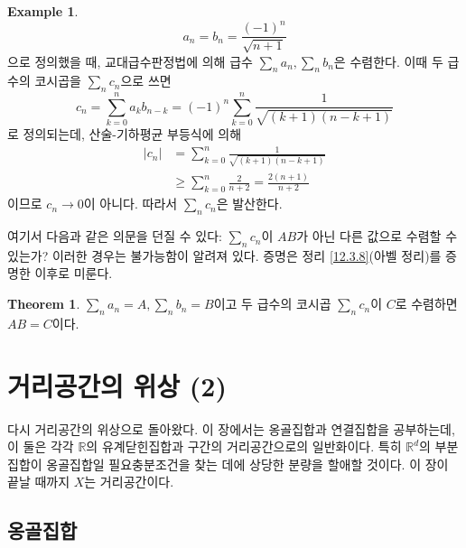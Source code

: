 \documentclass[11pt]{book}
\numberwithin{equation}{chapter}
\def\RR{\mathbb{R}}
\newcommand{\abs}[1]{\left\vert#1\right\vert}
\theoremstyle{definition}
\newtheorem{thm}{Theorem}[section]
\newtheorem*{ex}{Example}
\begin{document}
\begin{ex}
    \[
    a_n = b_n = \frac{(-1)^n}{\sqrt{n+1}}    
    \]
    으로 정의했을 때, 교대급수판정법에 의해 급수 \(\sum_n a_n, \sum_n b_n\)은 수렴한다. 이때 두 급수의 코시곱을 \(\sum_n c_n\)으로 쓰면
    \[
    c_n =  \sum_{k=0}^n a_k b_{n-k} = (-1)^n \sum_{k=0}^n \frac{1}{\sqrt{(k+1)(n-k+1)}}   
    \]
    로 정의되는데, 산술-기하평균 부등식에 의해
    \begin{align*}
        \abs{c_n} &= \sum_{k=0}^n \frac{1}{\sqrt{(k+1)(n-k+1)}}\\
        &\ge \sum_{k=0}^n \frac{2}{n+2} = \frac{2(n+1)}{n+2}
    \end{align*}
    이므로 \(c_n \to 0\)이 아니다. 따라서 \(\sum_n c_n\)은 발산한다.
\end{ex}

여기서 다음과 같은 의문을 던질 수 있다: \(\sum_n c_n\)이 \(AB\)가 아닌 다른 값으로 수렴할 수 있는가? 이러한 경우는 불가능함이 알려져 있다. 증명은 정리 \ref{12.3.8}(아벨 정리)를 증명한 이후로 미룬다.

\begin{thm} \label{5.9.3}
    \(\sum_n a_n = A, \sum_n b_n = B\)이고 두 급수의 코시곱 \(\sum_n c_n\)이 \(C\)로 수렴하면 \(AB = C\)이다.
\end{thm}



\chapter{거리공간의 위상 (2)}

다시 거리공간의 위상으로 돌아왔다. 이 장에서는 옹골집합과 연결집합을 공부하는데, 이 둘은 각각 \(\RR\)의 유계닫힌집합과 구간의 거리공간으로의 일반화이다. 특히 \(\RR^d\)의 부분집합이 옹골집합일 필요충분조건을 찾는 데에 상당한 분량을 할애할 것이다. 이 장이 끝날 때까지 \(X\)는 거리공간이다.

\section{옹골집합}
\end{document}
